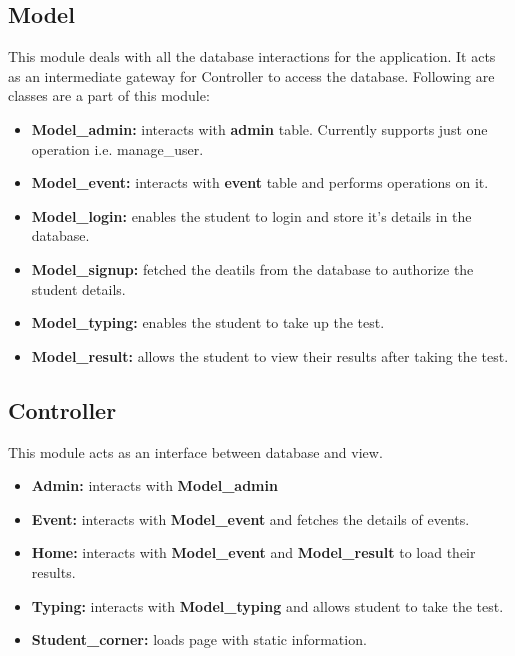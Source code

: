 \documentclass{mnnit}
\begin{document}
\subsection{Model}
This module deals with all the database interactions for the application. It acts as an intermediate gateway for Controller to access the database. Following are classes are a part of this module:
\begin{itemize}
    \item \textbf{Model\_admin:} interacts with \textbf{admin} table. Currently supports just one operation i.e. manage\_user.
    \item \textbf{Model\_event:} interacts with \textbf{event} table and performs operations on it.
    \item \textbf{Model\_login:} enables the student to login and store it's details in the database.
    \item \textbf{Model\_signup:} fetched the deatils from the database to authorize the student details.
    \item \textbf{Model\_typing:} enables the student to take up the test.
    \item \textbf{Model\_result:} allows the student to view their results after taking the test.
\end{itemize}
\subsection{Controller}
This module acts as an interface between database and view. 
\begin{itemize}
    \item \textbf{Admin:} interacts with \textbf{Model\_admin}
    \item \textbf{Event:} interacts with \textbf{Model\_event} and fetches the details of events.
    \item \textbf{Home:} interacts with \textbf{Model\_event} and \textbf{Model\_result} to load their results.
    \item \textbf{Typing:} interacts with \textbf{Model\_typing} and allows student to take the test. 
    \item \textbf{Student\_corner:} loads page with static information.
\end{itemize}
\end{document}
